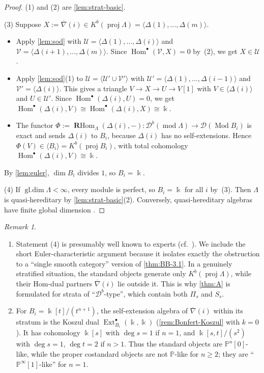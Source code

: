 \documentclass[11pt,reqno]{amsart}
\theoremstyle{plain}
\theoremstyle{definition}
\theoremstyle{remark}
\newtheorem{remark}[theorem]{Remark}
\newcommand{\kk}{\Bbbk}
\DeclareMathOperator{\Hom}{Hom}
\DeclareMathOperator{\Ext}{Ext}
\DeclareMathOperator{\gldim}{gl.dim}
\DeclareMathOperator{\RHom}{\mathbf{R}Hom}
\newcommand{\modd}{\operatorname{mod}}
\newcommand{\proj}{\operatorname{proj}}
\newcommand{\Db}{\mathcal{D}^b}
\newcommand{\Kb}{K^b}
\newcommand{\thick}[1]{\langle #1\rangle}
\newcommand{\Pn}[2]{\mathbb{P}^{#1}[#2]}
\newcommand{\nablabar}{\overline{\nabla}}
\newcommand{\cD}{\mathcal{D}}
\newcommand{\cU}{\mathcal{U}}
\newcommand{\cV}{\mathcal{V}}
\begin{document}
\begin{proof}
(1) and (2) are \cref{lem:strat-basic}.

(3) Suppose $X:=\nablabar(i)\in\Kb(\proj\Lambda)=\thick{\Delta(1),\dots,\Delta(m)}$.
\begin{itemize}
\item Apply \cref{lem:sod} with $\cU=\thick{\Delta(1),\dots,\Delta(i)}$ and $\cV=\thick{\Delta(i+1),\dots,\Delta(m)}$. Since $\Hom^\bullet(\cV,X)=0$ by~(2), we get $X\in\cU$.
\item Apply \cref{lem:sod}(1) to $\cU=\thick{\cU'\cup\cV'}$ with $\cU'=\thick{\Delta(1),\dots,\Delta(i-1)}$ and $\cV'=\thick{\Delta(i)}$. This gives a triangle $V\to X\to U\to V[1]$ with $V\in\thick{\Delta(i)}$ and $U\in\cU'$. Since $\Hom^\bullet(\Delta(i),U)=0$, we get $\Hom^\bullet(\Delta(i),V)\cong\Hom^\bullet(\Delta(i),X)\cong\kk$.
\item The functor $\Phi:=\RHom_\Lambda(\Delta(i),-)\colon\Db(\modd\Lambda)\to\cD(\operatorname{Mod}B_i)$ is exact and sends $\Delta(i)$ to $B_i$, because $\Delta(i)$ has no self-extensions. Hence $\Phi(V)\in\thick{B_i}=\Kb(\proj B_i)$, with total cohomology $\Hom^\bullet(\Delta(i),V)\cong\kk$.
\end{itemize}
By \cref{lem:euler}, $\dim B_i$ divides $1$, so $B_i=\kk$.

(4) If $\gldim\Lambda<\infty$, every module is perfect, so $B_i=\kk$ for all $i$ by~(3). Then $\Lambda$ is quasi-hereditary by \cref{lem:strat-basic}(2). Conversely, quasi-hereditary algebras have finite global dimension \cite{CPS88,DR92}.
\end{proof}

\begin{remark}
\leavevmode
\begin{enumerate}
\item Statement (4) is presumably well known to experts (cf.\ \cite{AHLU00,Dla96}). We include the short Euler-characteristic argument because it isolates exactly the obstruction to a ``single smooth category'' version of \cref{thm:BB-3.1}. In a genuinely stratified situation, the standard objects generate only $\Kb(\proj\Lambda)$, while their Hom-dual partners $\nablabar(i)$ lie outside it. This is why \cref{thm:A} is formulated for strata of ``$\Db$-type'', which contain both $\Pi_s$ and $S_s$.
\item For $B_i=\kk[t]/(t^{n+1})$, the self-extension algebra of $\nablabar(i)$ within its stratum is the Koszul dual $\Ext^\bullet_{B_i}(\kk,\kk)$ (\cref{rem:Bonfert-Koszul} with $k=0$). It has cohomology $\kk[s]$ with $\deg s=1$ if $n=1$, and $\kk[s,t]/(s^2)$ with $\deg s=1$, $\deg t=2$ if $n>1$. Thus the standard objects are $\Pn n0$-like, while the proper costandard objects are not $\mathbb{P}$-like for $n\ge2$; they are ``$\Pn\infty1$-like'' for $n=1$.
\end{enumerate}
\end{remark}
\end{document}
